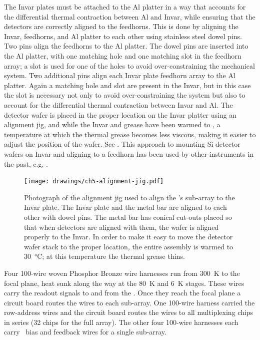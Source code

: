 The Invar plates must be attached to the Al platter in a way that accounts for the differential thermal contraction between Al and Invar, while ensuring that the detectors are correctly aligned to the feedhorns.
This is done by aligning the Invar, feedhorns, and Al platter to each other using stainless steel dowel pins.
Two pins align the feedhorns to the Al platter.
The dowel pins are inserted into the Al platter, with one matching hole and one matching slot in the feedhorn array; a slot is used for one of the holes to avoid over-constraining the mechanical system.
Two additional pins align each Invar plate feedhorn array to the Al platter.
Again a matching hole and slot are present in the Invar, but in this case the slot is necessary not only to avoid over-constraining the system but also to account for the differential thermal contraction between Invar and Al.
The detector wafer is placed in the proper location on the Invar platter using an alignment jig, and while the Invar and grease have been warmed to , a temperature at which the thermal grease becomes less viscous, making it easier to adjust the position of the wafer.
See .
This approach to mounting Si detector wafers on Invar and aligning to a feedhorn has been used by other instruments in the past, e.g. \cite{schwan_invited_2011}.

\begin{figure}
\centering
\texttt{[image: drawings/ch5-alignment-jig.pdf]}
\caption[Alignment jig]{
  Photograph of the alignment jig used to align the \Imager's sub-array to the Invar plate.
  The Invar plate and the metal bar are aligned to each other with dowel pins.
  The metal bar has conical cut-outs placed so that when detectors are aligned with them, the wafer is aligned properly to the Invar.
  In order to make it easy to move the detector wafer stack to the proper location, the entire assembly is warmed to \SI{30}{\celsius}; at this temperature the thermal grease thins.
}
\label{fig:ch5-alignment-jig}
\end{figure}

Four 100-wire woven Phosphor Bronze wire harnesses run from \SI{300}{\K} to the focal plane, heat sunk along the way at the \SI{80}{\K} and \SI{6}{\K} stages.
These wires carry the readout signals to and from the \MCE.
Once they reach the focal plane a circuit board routes the wires to each sub-array.
One 100-wire harness carried the row-address wires and the circuit board routes the wires to all multiplexing chips in series (32 chips for the full array).
The other four 100-wire harnesses each carry \SQUID\ bias and feedback wires for a single sub-array.


